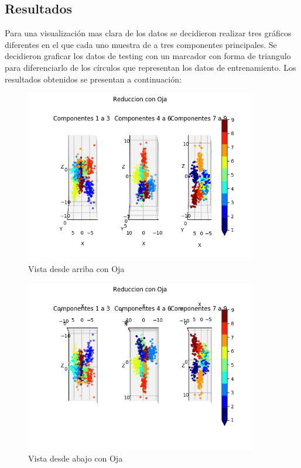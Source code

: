 \subsection{Resultados}
Para una visualización mas clara de los datos se decidieron realizar tres
gráficos diferentes en el que cada uno muestra de a tres componentes
principales. Se decidieron graficar los datos de testing con un marcador con
forma de triangulo para diferenciarlo de los círculos que representan los datos
de entrenamiento. Los resultados obtenidos se presentan a continuación:


\begin{figure}[H]
  \includegraphics[width=0.9\textwidth]{imagenes/componentes_oja_1.png}
  \caption{Vista desde arriba con Oja}
\end{figure}

\begin{figure}[H]
  \includegraphics[width=0.9\textwidth]{imagenes/componentes_oja_2.png}
  \caption{Vista desde abajo con Oja}
\end{figure}

